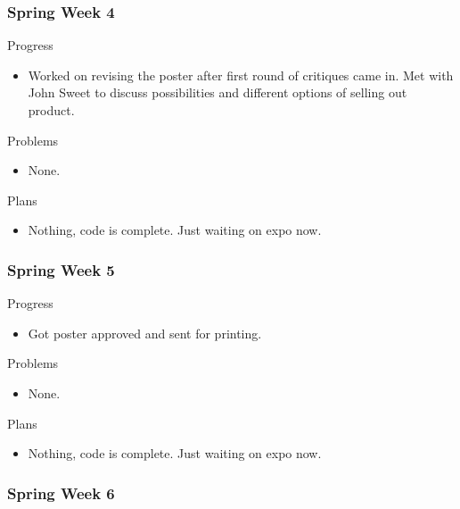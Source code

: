     \subsubsection{Spring Week 4}
    
        \noindent
        Progress
        \begin{itemize}
            \item Worked on revising the poster after first round of critiques came in.  Met with John Sweet to discuss possibilities and different options of selling out product.
        \end{itemize}
        
        \noindent
        Problems
        \begin{itemize}
            \item None.
        \end{itemize}
        
        \noindent
        Plans
        \begin{itemize}
            \item Nothing, code is complete.  Just waiting on expo now.
        \end{itemize}
        
    \subsubsection{Spring Week 5}
    
        \noindent
        Progress
        \begin{itemize}
            \item Got poster approved and sent for printing.
        \end{itemize}
        
        \noindent
        Problems
        \begin{itemize}
            \item None.
        \end{itemize}
        
        \noindent
        Plans
        \begin{itemize}
            \item Nothing, code is complete.  Just waiting on expo now.
        \end{itemize}
        
    \subsubsection{Spring Week 6}
    
